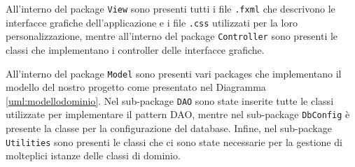 All'interno del package \texttt{View} sono presenti tutti i file \texttt{.fxml} che descrivono le interfacce grafiche dell'applicazione e i file \texttt{.css} utilizzati per la loro personalizzazione, mentre all'interno del package \texttt{Controller} sono presenti le classi che implementano i controller delle interfacce grafiche.
\bigskip

All'interno del package \texttt{Model} sono presenti vari packages che implementano il modello del nostro progetto come presentato nel Diagramma \ref{uml:modellodominio}. Nel sub-package \texttt{DAO} sono state inserite tutte le classi utilizzate per implementare il pattern DAO, mentre nel sub-package \texttt{DbConfig} è presente la classe per la configurazione del database. Infine,  nel sub-package \texttt{Utilities} sono presenti le classi che ci sono state necessarie per la gestione di molteplici istanze delle classi di dominio.